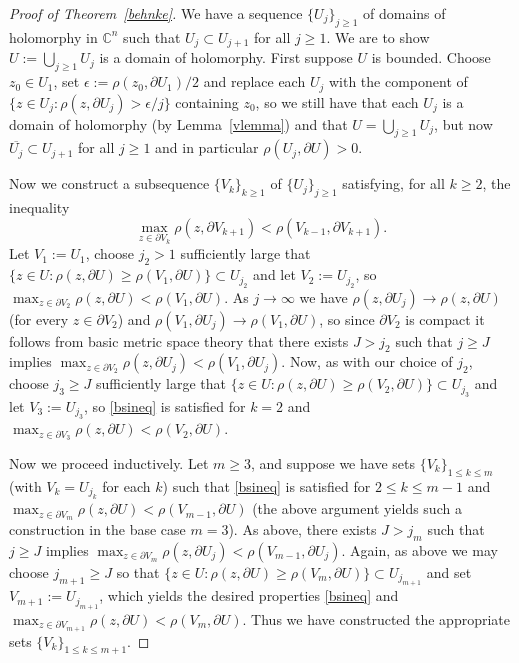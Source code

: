 \documentclass[11pt,a4paper, final, twoside]{article}
\numberwithin{equation}{section}
\newcommand{\C}{\mathbb C}
\newcommand{\clos}[1]{\overline{#1}}
\newcommand{\bd}{\partial}
\newcommand{\pmetric}{\rho}
\begin{document}
\begin{proof}[Proof of Theorem~\ref{behnke}]
We have a sequence $\{U_j\}_{j\geq 1}$ of domains of holomorphy in $\C^n$ such that $U_j\subset U_{j+1}$ for all $j\geq 1$. We are to show $U:=\bigcup_{j\geq 1} U_j$ is a domain of holomorphy.
First suppose $U$ is bounded. Choose $z_0\in U_1$, set $\epsilon:=\pmetric(z_0,\bd U_1)/2$ and replace each $U_j$ with the component of $\{z\in U_j\colon \pmetric(z,\bd U_j)>\epsilon/j\}$ containing
$z_0$, so we still have that each $U_j$ is a domain of holomorphy (by Lemma~\ref{vlemma}) and that $U=\bigcup_{j\geq 1}U_j$, but now $\clos{U_j}\subset U_{j+1}$ for all $j\geq 1$ and in particular
$\pmetric(U_j,\bd U)>0$.

Now we construct a subsequence $\{V_k\}_{k\geq 1}$ of $\{U_j\}_{j\geq 1}$ satisfying, for all $k\geq 2$, the inequality
\begin{equation} \max_{z\in\bd V_k} \pmetric(z,\bd V_{k+1})<\pmetric(V_{k-1},\bd V_{k+1}).\label{bsineq}\end{equation}
Let $V_1:=U_1$, choose $j_2>1$ sufficiently large that $\{z\in U\colon\pmetric(z,\bd U)\geq \pmetric(V_1,\bd U)\}\subset U_{j_2}$ and let $V_2:=U_{j_2}$,
so $\max_{z\in\bd V_2}\pmetric(z,\bd U)<\pmetric(V_1,\bd U)$. As $j\to\infty$ we have $\pmetric(z,\bd U_j)\to\pmetric(z,\bd U)$ (for every $z\in \bd V_2$) 
and $\pmetric(V_1,\bd U_j)\to\pmetric(V_1,\bd U)$, so since $\bd V_2$ is compact it follows from basic metric space theory that 
there exists $J>j_2$ such that $j\geq J$ implies $\max_{z\in\bd V_2}\pmetric(z,\bd U_j)<\pmetric(V_1,\bd U_j)$. 
Now, as with our choice of $j_2$, choose $j_3\geq J$ sufficiently large that $\{z\in U\colon\pmetric(z,\bd U)\geq \pmetric(V_2,\bd U)\}\subset U_{j_3}$ and let $V_3:=U_{j_3}$,
so \eqref{bsineq} is satisfied for $k=2$ and $\max_{z\in\bd V_3}\pmetric(z,\bd U)<\pmetric(V_2,\bd U)$.

Now we proceed inductively.
Let $m\geq 3$, and suppose we have sets $\{V_k\}_{1\leq k\leq m}$ (with $V_k=U_{j_k}$ for each $k$) such that \eqref{bsineq} is satisfied for $2\leq k\leq m-1$ and 
$\max_{z\in\bd V_m}\pmetric(z,\bd U)<\pmetric(V_{m-1},\bd U)$ (the above argument yields such a construction in the base case $m=3$). 
As above, there exists $J>j_m$ such that $j\geq J$ implies $\max_{z\in\bd V_m}\pmetric(z,\bd U_j)<\pmetric(V_{m-1},\bd U_j)$. Again, 
as above we may choose $j_{m+1}\geq J$ so that $\{z\in U\colon\pmetric(z,\bd U)\geq \pmetric(V_m,\bd U)\}\subset U_{j_{m+1}}$ and set $V_{m+1}:=U_{j_{m+1}}$,
which yields the desired properties \eqref{bsineq} and $\max_{z\in\bd V_{m+1}}\pmetric(z,\bd U)<\pmetric(V_m,\bd U)$. Thus we have constructed the appropriate sets $\{V_k\}_{1\leq k\leq m+1}$.


\end{proof}
\end{document}
